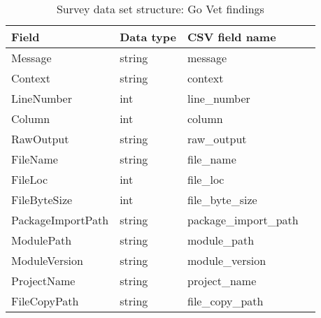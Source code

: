         \begin{table}[h]
            \centering
            \caption{Survey data set structure: Go Vet findings}
            \label{tbl:datastructure-vet-findings}
            \begin{tabular}{llll}
                \toprule
                Field & Data type & CSV field name \\
                \midrule
                Message              & string & message \\
                Context              & string & context \\
                LineNumber           & int    & line\_number \\
                Column               & int    & column \\
                RawOutput            & string & raw\_output \\
                FileName             & string & file\_name \\
                FileLoc              & int    & file\_loc \\
                FileByteSize         & int    & file\_byte\_size \\
                PackageImportPath    & string & package\_import\_path \\
                ModulePath           & string & module\_path \\
                ModuleVersion        & string & module\_version \\
                ProjectName          & string & project\_name \\
                FileCopyPath         & string & file\_copy\_path \\
                \bottomrule
            \end{tabular}
        \end{table}

